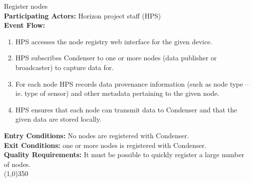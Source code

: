 		Register nodes	\\	 
		\textbf{Participating Actors:} Horizon project staff (HPS)  \\
		\textbf{Event Flow:}
		\begin{enumerate}
\item HPS accesses the node registry web interface for the given device. 
\item HPS subscribes Condenser to one or more nodes (data publisher or broadcaster) to capture data for.
\item For each node HPS records data provenance information (such as node type -- ie. type of sensor) and other metadata pertaining to the given node.
\item HPS ensures that each node can transmit data to Condenser and that the given data are stored locally.
	    \end{enumerate}
		\textbf{Entry Conditions:} No nodes are registered with Condenser.\\
		\textbf{Exit Conditions:} one or more nodes is registered with Condenser.\\
		\textbf{Quality Requirements:} It must be possible to quickly register a large number of nodes.\\
		\line(1,0){350}